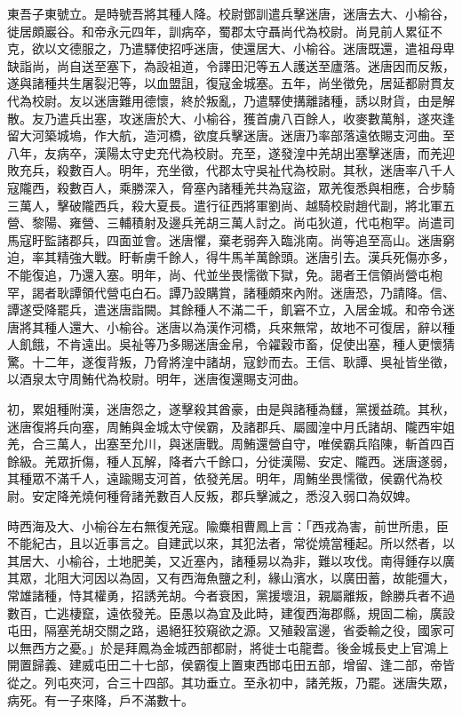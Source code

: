 \begin{pinyinscope}
東吾子東號立。是時號吾將其種人降。校尉鄧訓遣兵擊迷唐，迷唐去大、小榆谷，徙居頗巖谷。和帝永元四年，訓病卒，蜀郡太守聶尚代為校尉。尚見前人累征不克，欲以文德服之，乃遣驛使招呼迷唐，使還居大、小榆谷。迷唐既還，遣祖母卑缺詣尚，尚自送至塞下，為設祖道，令譯田汜等五人護送至廬落。迷唐因而反叛，遂與諸種共生屠裂汜等，以血盟詛，復寇金城塞。五年，尚坐徵免，居延都尉貫友代為校尉。友以迷唐難用德懷，終於叛亂，乃遣驛使搆離諸種，誘以財貨，由是解散。友乃遣兵出塞，攻迷唐於大、小榆谷，獲首虜八百餘人，收麥數萬斛，遂夾逢留大河築城塢，作大航，造河橋，欲度兵擊迷唐。迷唐乃率部落遠依賜支河曲。至八年，友病卒，漢陽太守史充代為校尉。充至，遂發湟中羌胡出塞擊迷唐，而羌迎敗充兵，殺數百人。明年，充坐徵，代郡太守吳祉代為校尉。其秋，迷唐率八千人寇隴西，殺數百人，乘勝深入，脅塞內諸種羌共為寇盜，眾羌復悉與相應，合步騎三萬人，擊破隴西兵，殺大夏長。遣行征西將軍劉尚、越騎校尉趙代副，將北軍五營、黎陽、雍營、三輔積射及邊兵羌胡三萬人討之。尚屯狄道，代屯枹罕。尚遣司馬寇盱監諸郡兵，四面並會。迷唐懼，棄老弱奔入臨洮南。尚等追至高山。迷唐窮迫，率其精強大戰。盱斬虜千餘人，得牛馬羊萬餘頭。迷唐引去。漢兵死傷亦多，不能復追，乃還入塞。明年，尚、代並坐畏懦徵下獄，免。謁者王信領尚營屯枹罕，謁者耿譚領代營屯白石。譚乃設購賞，諸種頗來內附。迷唐恐，乃請降。信、譚遂受降罷兵，遣迷唐詣闕。其餘種人不滿二千，飢窘不立，入居金城。和帝令迷唐將其種人還大、小榆谷。迷唐以為漢作河橋，兵來無常，故地不可復居，辭以種人飢餓，不肯遠出。吳祉等乃多賜迷唐金帛，令糴穀巿畜，促使出塞，種人更懷猜驚。十二年，遂復背叛，乃脅將湟中諸胡，寇鈔而去。王信、耿譚、吳祉皆坐徵，以酒泉太守周鮪代為校尉。明年，迷唐復還賜支河曲。

初，累姐種附漢，迷唐怨之，遂擊殺其酋豪，由是與諸種為讎，黨援益疏。其秋，迷唐復將兵向塞，周鮪與金城太守侯霸，及諸郡兵、屬國湟中月氏諸胡、隴西牢姐羌，合三萬人，出塞至允川，與迷唐戰。周鮪還營自守，唯侯霸兵陷陳，斬首四百餘級。羌眾折傷，種人瓦解，降者六千餘口，分徙漢陽、安定、隴西。迷唐遂弱，其種眾不滿千人，遠踰賜支河首，依發羌居。明年，周鮪坐畏懦徵，侯霸代為校尉。安定降羌燒何種脅諸羌數百人反叛，郡兵擊滅之，悉沒入弱口為奴婢。

時西海及大、小榆谷左右無復羌寇。隃麋相曹鳳上言：「西戎為害，前世所患，臣不能紀古，且以近事言之。自建武以來，其犯法者，常從燒當種起。所以然者，以其居大、小榆谷，土地肥美，又近塞內，諸種易以為非，難以攻伐。南得鍾存以廣其眾，北阻大河因以為固，又有西海魚鹽之利，緣山濱水，以廣田蓄，故能彊大，常雄諸種，恃其權勇，招誘羌胡。今者衰困，黨援壞沮，親屬離叛，餘勝兵者不過數百，亡逃棲竄，遠依發羌。臣愚以為宜及此時，建復西海郡縣，規固二榆，廣設屯田，隔塞羌胡交關之路，遏絕狂狡窺欲之源。又殖穀富邊，省委輸之役，國家可以無西方之憂。」於是拜鳳為金城西部都尉，將徙士屯龍耆。後金城長史上官鴻上開置歸義、建威屯田二十七部，侯霸復上置東西邯屯田五部，增留、逢二部，帝皆從之。列屯夾河，合三十四部。其功垂立。至永初中，諸羌叛，乃罷。迷唐失眾，病死。有一子來降，戶不滿數十。


\end{pinyinscope}
